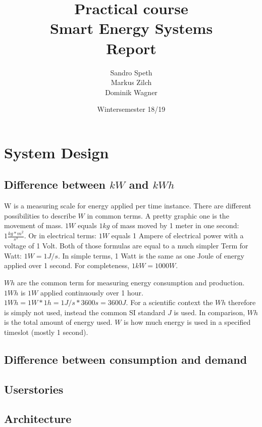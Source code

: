 \documentclass[12pt]{scrartcl}
\title{Practical course
\\ Smart Energy Systems\\
	Report}
\date{Wintersemester 18/19}
\author{Sandro Speth\\
Markus Zilch\\
Dominik Wagner}
\begin{document}
\maketitle


\section{System Design}\label{sec:systemdesign}

\subsection{Difference between $kW$ and $kWh$}\label{sec:diffEnergy}
W is a measuring scale for energy applied per time instance.
There are different possibilities to describe $W$ in common terms.
A pretty graphic one is the movement of mass.
$1W$ equals $1kg$ of mass moved by 1 meter in one second: $1 \frac{kg*m^2}{s^3}$.
Or in electrical terms: $1W$ equals 1 Ampere of electrical power with a voltage of 1 Volt.
Both of those formulas are equal to a much simpler Term for Watt: $1 W = 1 J/s$.
In simple terms, 1 Watt is the same as one Joule of energy applied over 1 second.
For completeness, $1kW = 1000 W$\cite{Nelson}\cite{Borvon}\cite{SIStandard}.

$Wh$ are the common term for measuring energy consumption and production.
$1Wh$ is $1W$ applied continuously over 1 hour.
$1Wh = 1 W * 1h = 1 J/s * 3600s = 3600J$.
For a scientific context the $Wh$ therefore is simply not used, instead the common SI standard $J$ is used.
In comparison, $Wh$ is the total amount of energy used. $W$ is how much energy is used in a specified timeslot (mostly 1 second)\cite{EURichtlinie}\cite{Bundesgesetz}.


\subsection{Difference between consumption and demand}\label{sec:diffconsumptiondemand}



\subsection{Userstories}\label{sec:userstories}


\subsection{Architecture}






\end{document}
